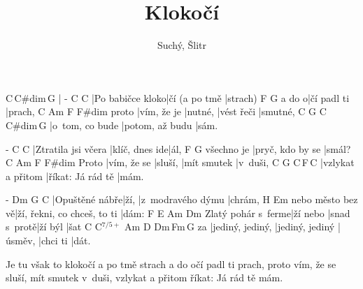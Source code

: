 \documentclass{song}
\title{Klokočí}
\author{Suchý, Šlitr}
\begin{document}
\strophe
C\,C\#dim\,G\7
|
-                C			  C\7
|Po babičce kloko|čí (a po tmě |strach)
      F           G\7
a do o|čí padl ti |prach,
      C           Am      F          F\#dim
proto |vím, že je |nutné, |vést řeči |smutné,
C               G\7             C\,C\#dim\,G\7
|o~tom, co bude |potom, až budu |sám.
\endstrophe

\strophe
-                   C              C\7
|Ztratila jsi včera |klíč, dnes ide|ál,
           F                G\7
všechno je |pryč, kdo by se |smál?
      C           Am      F           F\#dim
Proto |vím, že se |sluší, |mít smutek |v~duši,
C                 G\7               C\,F\,C
|vzlykat a přitom |říkat: Já rád tě |mám.
\endstrophe

\strophe
-              Dm   G\7               C
|Opuštěné nábře|ží, |z~modravého dýmu |chrám,
                 H\7                         Em
nebo město bez vě|ží, řekni, co chceš, to ti |dám:
                   F        E\7          Am      Dm\7
Zlatý pohár s~ferme|ží nebo |snad s~protě|ží býl |šat
   C                C$^{7/5+}$      Am      D\7      Dm\7\,Fm\,G\7
za |jediný, jediný, |jediný, jediný |úsměv, |chci ti |dát.
\endstrophe

\strophe*
Je tu však to klokočí a po tmě strach
a do očí padl ti prach,
proto vím, že se sluší, mít smutek v~duši,
vzlykat a přitom říkat: Já rád tě mám.
\endstrophe

\end{document}
